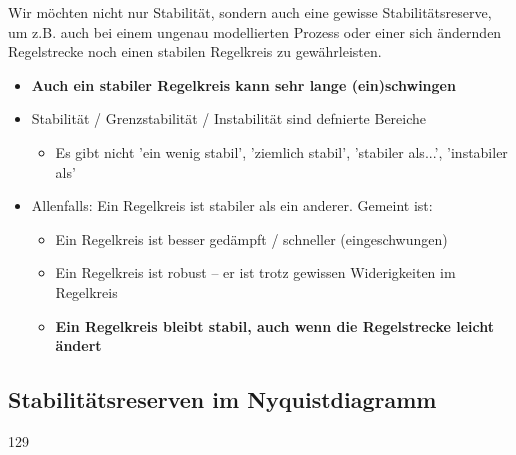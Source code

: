 Wir möchten nicht nur Stabilität, sondern auch eine gewisse Stabilitätsreserve, um z.B. auch bei einem ungenau
modellierten Prozess oder einer sich ändernden Regelstrecke noch einen stabilen Regelkreis zu gewährleisten. 
\vspace{0.2cm}
\begin{itemize}
    \item \textbf{Auch ein stabiler Regelkreis kann sehr lange (ein)schwingen}
    \item Stabilität / Grenzstabilität / Instabilität sind defnierte Bereiche
    \begin{itemize}
        \item Es gibt nicht 'ein wenig stabil', 'ziemlich stabil', 'stabiler als...', 'instabiler als'
    \end{itemize}
    \item Allenfalls: Ein Regelkreis ist stabiler als ein anderer. Gemeint ist:
    \begin{itemize}
        \item Ein Regelkreis ist besser gedämpft / schneller (eingeschwungen)
        \item Ein Regelkreis ist robust -- er ist trotz gewissen Widerigkeiten im Regelkreis
        \item \textbf{Ein Regelkreis bleibt stabil, auch wenn die Regelstrecke leicht ändert}
    \end{itemize}
\end{itemize}


\subsection{Stabilitätsreserven im Nyquistdiagramm}{129}


